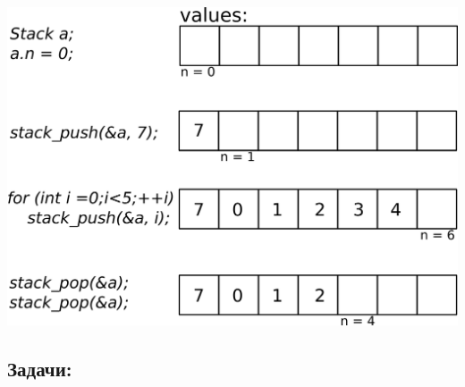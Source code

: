 \documentclass[10pt]{article}
\begin{document}
\begin{center}
\includegraphics[width=0.6\linewidth]{../images/stack.png}
\end{center}

\subsection*{Задачи:}
\end{document}
